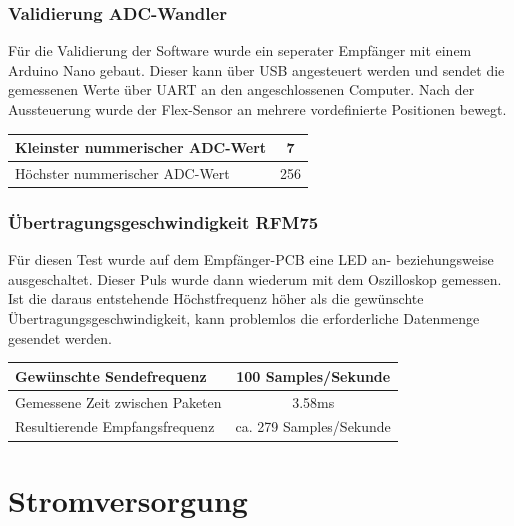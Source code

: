 \subsubsection*{Validierung ADC-Wandler}
Für die Validierung der Software wurde ein seperater Empfänger mit einem Arduino Nano gebaut. Dieser kann über USB angesteuert werden und sendet die gemessenen Werte über UART an den angeschlossenen Computer.
Nach der Aussteuerung wurde der Flex-Sensor an mehrere vordefinierte Positionen bewegt. 
\begin{center}
	\begin{tabular}{l|c}
		\hline 
		Kleinster nummerischer ADC-Wert & 7 \\ \hline
		Höchster nummerischer ADC-Wert & 256 \\ \hline
	\end{tabular} 
	\label{tab:MagicGlovevalid2}
\end{center}

\subsubsection*{Übertragungsgeschwindigkeit RFM75}
Für diesen Test wurde auf dem Empfänger-PCB eine LED an- beziehungsweise ausgeschaltet. Dieser Puls wurde dann wiederum mit dem Oszilloskop gemessen. Ist die daraus entstehende Höchstfrequenz höher als die gewünschte Übertragungsgeschwindigkeit, 
kann problemlos die erforderliche Datenmenge gesendet werden.
\begin{center}
	\begin{tabular}{l|c}
		\hline 
		Gewünschte Sendefrequenz & 100 Samples/Sekunde \\ \hline
		Gemessene Zeit zwischen Paketen & 3.58ms \\ \hline
		Resultierende Empfangsfrequenz & ca. 279 Samples/Sekunde \\ \hline
	\end{tabular} 
	\label{tab:MagicGlovevalid3}
\end{center}
\section{Stromversorgung} \label{ValidStromversorgung}

